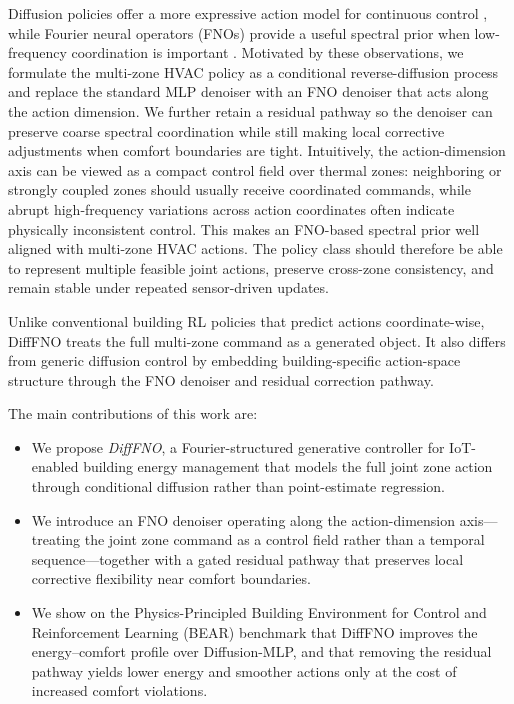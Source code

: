 ﻿\documentclass[conference]{IEEEtran}
\theoremstyle{nonumberplain}
\theoremstyle{plain}
\begin{document}
Diffusion policies offer a more expressive action model for continuous control \cite{chi2025diffusion,janner2022planning,wang2023diffusion}, while Fourier neural operators (FNOs) provide a useful spectral prior when low-frequency coordination is important \cite{li2021fourier,liu2024mitigating}. Motivated by these observations, we formulate the multi-zone HVAC policy as a conditional reverse-diffusion process and replace the standard MLP denoiser with an FNO denoiser that acts along the action dimension. We further retain a residual pathway so the denoiser can preserve coarse spectral coordination while still making local corrective adjustments when comfort boundaries are tight. Intuitively, the action-dimension axis can be viewed as a compact control field over thermal zones: neighboring or strongly coupled zones should usually receive coordinated commands, while abrupt high-frequency variations across action coordinates often indicate physically inconsistent control. This makes an FNO-based spectral prior well aligned with multi-zone HVAC actions. The policy class should therefore be able to represent multiple feasible joint actions, preserve cross-zone consistency, and remain stable under repeated sensor-driven updates.

Unlike conventional building RL policies that predict actions coordinate-wise, DiffFNO treats the full multi-zone command as a generated object. It also differs from generic diffusion control by embedding building-specific action-space structure through the FNO denoiser and residual correction pathway.

The main contributions of this work are:
\begin{itemize}
    \item We propose \emph{DiffFNO}, a Fourier-structured generative controller for IoT-enabled building energy management that models the full joint zone action through conditional diffusion rather than point-estimate regression.
    \item We introduce an FNO denoiser operating along the action-dimension axis---treating the joint zone command as a control field rather than a temporal sequence---together with a gated residual pathway that preserves local corrective flexibility near comfort boundaries.
    \item We show on the Physics-Principled Building Environment for Control and Reinforcement Learning (BEAR) benchmark that DiffFNO improves the energy--comfort profile over Diffusion-MLP, and that removing the residual pathway yields lower energy and smoother actions only at the cost of increased comfort violations.
\end{itemize}
\end{document}
